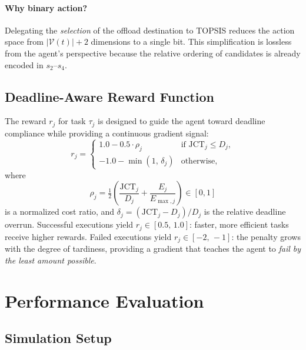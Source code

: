 \documentclass[iicol]{sn-jnl}
\begin{document}
\paragraph{Why binary action?}
Delegating the \emph{selection} of the offload destination to TOPSIS reduces
the action space from $|\mathcal{V}(t)| + 2$ dimensions to a single bit.
This simplification is lossless from the agent's perspective because the
relative ordering of candidates is already encoded in $s_2$--$s_4$.

\subsection{Deadline-Aware Reward Function}
\label{sec:reward}

The reward $r_j$ for task $\tau_j$ is designed to guide the agent toward
deadline compliance while providing a continuous gradient signal:
\begin{equation}
  r_j = \begin{cases}
    1.0 - 0.5 \cdot \rho_j        & \text{if } \mathrm{JCT}_j \le D_j, \\
    -1.0 - \min(1,\,\delta_j)     & \text{otherwise,}
  \end{cases}
  \label{eq:reward}
\end{equation}
where
\begin{equation}
  \rho_j = \tfrac{1}{2}\!\left(\frac{\mathrm{JCT}_j}{D_j}
                              + \frac{E_j}{E_{\max,j}}\right) \in [0,1]
  \label{eq:rho}
\end{equation}
is a normalized cost ratio, and $\delta_j = (\mathrm{JCT}_j - D_j)/D_j$ is
the relative deadline overrun.
Successful executions yield $r_j \in [0.5,\,1.0]$: faster, more efficient
tasks receive higher rewards.
Failed executions yield $r_j \in [-2,\,-1]$: the penalty grows with the degree
of tardiness, providing a gradient that teaches the agent to \emph{fail
by the least amount possible}.

\section{Performance Evaluation}
\label{sec:eval}

\subsection{Simulation Setup}
\end{document}
